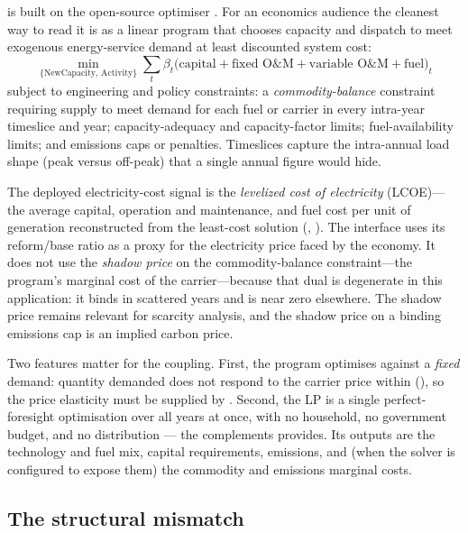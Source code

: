 \CLEWS{} \citep{howells_clews_2013} is built on the open-source \OSeMOSYS{} optimiser
\citep{howells_osemosys_2011}. For an economics audience the cleanest way to read it is as
a linear program that chooses capacity and dispatch to meet exogenous energy-service
demand at least discounted system cost:
\begin{equation}
  \min_{\{\text{NewCapacity},\,\text{Activity}\}}
    \sum_{t}\beta_t\bigl(\text{capital}+\text{fixed O\&M}+\text{variable O\&M}+\text{fuel}\bigr)_t
  \label{eq:lp}
\end{equation}
subject to engineering and policy constraints: a \emph{commodity-balance} constraint
requiring supply to meet demand for each fuel or carrier in every intra-year timeslice and
year; capacity-adequacy and capacity-factor limits; fuel-availability limits; and
emissions caps or penalties. Timeslices capture the intra-annual load shape (peak versus
off-peak) that a single annual figure would hide.

The deployed electricity-cost signal is the \emph{levelized cost of electricity}
(LCOE)---the average capital, operation and maintenance, and fuel cost per unit of
generation reconstructed from the least-cost solution (,
). The interface uses its reform/base ratio as a proxy for the
electricity price faced by the economy. It does not use the \emph{shadow price} on the
commodity-balance constraint---the program's marginal cost of the carrier---because that
dual is degenerate in this application: it binds in scattered years and is near zero
elsewhere. The shadow price remains relevant for scarcity analysis, and the shadow price
on a binding emissions cap is an implied carbon price.

Two features matter for the coupling. First, the program optimises against a \emph{fixed}
demand: quantity demanded does not respond to the carrier price within \OSeMOSYS{}
(), so the price elasticity must be supplied by \OGCore{}. Second, the
LP is a single perfect-foresight optimisation over all years at once, with no household,
no government budget, and no distribution --- the complements \OGCore{} provides. Its
outputs are the technology and fuel mix, capital requirements, emissions, and (when the
solver is configured to expose them) the commodity and emissions marginal costs.

\subsection{The structural mismatch}
\label{sec:mismatch}

